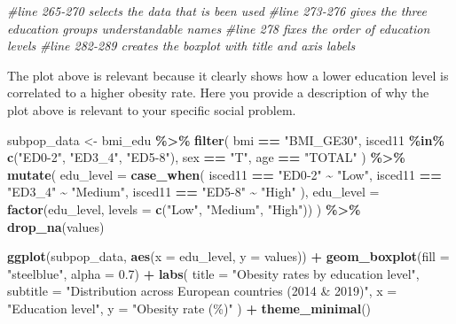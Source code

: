 \documentclass[
]{article}
\newenvironment{Shaded}{\begin{snugshade}}{\end{snugshade}}
\newcommand{\AttributeTok}[1]{\textcolor[rgb]{0.13,0.29,0.53}{#1}}
\newcommand{\CommentTok}[1]{\textcolor[rgb]{0.56,0.35,0.01}{\textit{#1}}}
\newcommand{\FloatTok}[1]{\textcolor[rgb]{0.00,0.00,0.81}{#1}}
\newcommand{\FunctionTok}[1]{\textcolor[rgb]{0.13,0.29,0.53}{\textbf{#1}}}
\newcommand{\NormalTok}[1]{#1}
\newcommand{\OtherTok}[1]{\textcolor[rgb]{0.56,0.35,0.01}{#1}}
\newcommand{\SpecialCharTok}[1]{\textcolor[rgb]{0.81,0.36,0.00}{\textbf{#1}}}
\newcommand{\StringTok}[1]{\textcolor[rgb]{0.31,0.60,0.02}{#1}}
\begin{document}
\begin{Shaded}
\begin{Highlighting}[]

\CommentTok{\#line 265{-}270 selects the data that is been used}
\CommentTok{\#line 273{-}276 gives the three education groups understandable names}
\CommentTok{\#line 278 fixes the order of education levels}
\CommentTok{\#line 282{-}289 creates the boxplot with title and axis labels}
\end{Highlighting}
\end{Shaded}

The plot above is relevant because it clearly shows how a lower
education level is correlated to a higher obesity rate. Here you provide
a description of why the plot above is relevant to your specific social
problem.

\begin{Shaded}
\begin{Highlighting}[]
\NormalTok{subpop\_data }\OtherTok{\textless{}{-}}\NormalTok{ bmi\_edu }\SpecialCharTok{\%\textgreater{}\%}
  \FunctionTok{filter}\NormalTok{(}
\NormalTok{    bmi }\SpecialCharTok{==} \StringTok{"BMI\_GE30"}\NormalTok{,}
\NormalTok{    isced11 }\SpecialCharTok{\%in\%} \FunctionTok{c}\NormalTok{(}\StringTok{"ED0{-}2"}\NormalTok{, }\StringTok{"ED3\_4"}\NormalTok{, }\StringTok{"ED5{-}8"}\NormalTok{),}
\NormalTok{    sex }\SpecialCharTok{==} \StringTok{"T"}\NormalTok{,}
\NormalTok{    age }\SpecialCharTok{==} \StringTok{"TOTAL"}
\NormalTok{  ) }\SpecialCharTok{\%\textgreater{}\%}
  \FunctionTok{mutate}\NormalTok{(}
    \AttributeTok{edu\_level =} \FunctionTok{case\_when}\NormalTok{(}
\NormalTok{      isced11 }\SpecialCharTok{==} \StringTok{"ED0{-}2"} \SpecialCharTok{\textasciitilde{}} \StringTok{"Low"}\NormalTok{,}
\NormalTok{      isced11 }\SpecialCharTok{==} \StringTok{"ED3\_4"} \SpecialCharTok{\textasciitilde{}} \StringTok{"Medium"}\NormalTok{,}
\NormalTok{      isced11 }\SpecialCharTok{==} \StringTok{"ED5{-}8"} \SpecialCharTok{\textasciitilde{}} \StringTok{"High"}
\NormalTok{    ),}
    \AttributeTok{edu\_level =} \FunctionTok{factor}\NormalTok{(edu\_level, }\AttributeTok{levels =} \FunctionTok{c}\NormalTok{(}\StringTok{"Low"}\NormalTok{, }\StringTok{"Medium"}\NormalTok{, }\StringTok{"High"}\NormalTok{))}
\NormalTok{  ) }\SpecialCharTok{\%\textgreater{}\%}
  \FunctionTok{drop\_na}\NormalTok{(values)}

\FunctionTok{ggplot}\NormalTok{(subpop\_data, }\FunctionTok{aes}\NormalTok{(}\AttributeTok{x =}\NormalTok{ edu\_level, }\AttributeTok{y =}\NormalTok{ values)) }\SpecialCharTok{+}
  \FunctionTok{geom\_boxplot}\NormalTok{(}\AttributeTok{fill =} \StringTok{"steelblue"}\NormalTok{, }\AttributeTok{alpha =} \FloatTok{0.7}\NormalTok{) }\SpecialCharTok{+}
  \FunctionTok{labs}\NormalTok{(}
    \AttributeTok{title =} \StringTok{"Obesity rates by education level"}\NormalTok{,}
    \AttributeTok{subtitle =} \StringTok{"Distribution across European countries (2014 \& 2019)"}\NormalTok{,}
    \AttributeTok{x =} \StringTok{"Education level"}\NormalTok{,}
    \AttributeTok{y =} \StringTok{"Obesity rate (\%)"}
\NormalTok{  ) }\SpecialCharTok{+}
  \FunctionTok{theme\_minimal}\NormalTok{()}
\end{Highlighting}
\end{Shaded}
\end{document}
